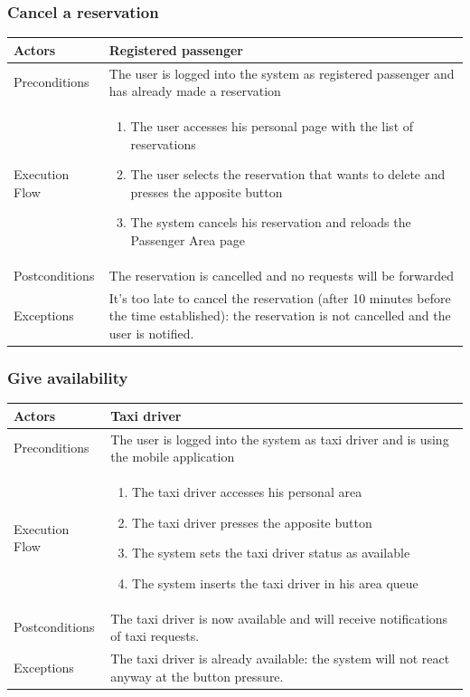 		\subsubsection{Cancel a reservation}
			\begin{center}
				\begin{tabular}{ | l | p{8cm} |}
					\hline Actors & Registered passenger
					\\ \hline
					Preconditions &
					The user is logged into the system as registered passenger and has already made
					a reservation
					\\ \hline
					Execution Flow &
					\begin{enumerate}
						\item The user accesses his personal page with the list of reservations
						\item The user selects the reservation that wants to delete and presses the apposite
						button
						\item The system cancels his reservation and reloads the Passenger Area page
					\end{enumerate}
					\\ \hline
					Postconditions & The reservation is cancelled and no requests will be forwarded
					\\ \hline
					Exceptions &
					It's too late to cancel the reservation (after 10 minutes before the time established):
					the reservation is not cancelled and the user is notified.
					\\ \hline
				\end{tabular}
			\end{center}
		\subsubsection{Give availability}
			\begin{center}
				\begin{tabular}{ | l | p{8cm} |}
					\hline Actors & Taxi driver
					\\ \hline
					Preconditions &
					The user is logged into the system as taxi driver and is using the mobile application
					\\ \hline
					Execution Flow &
					\begin{enumerate}
						\item The taxi driver accesses his personal area
						\item The taxi driver presses the apposite button
						\item The system sets the taxi driver status as available
						\item The system inserts the taxi driver in his area queue
					\end{enumerate}
					\\ \hline
					Postconditions & 
					The taxi driver is now available and will receive notifications of taxi requests.
					\\ \hline
					Exceptions &
					The taxi driver is already available: the system will not react anyway at the button
					pressure.
					\\ \hline
				\end{tabular}
			\end{center}

